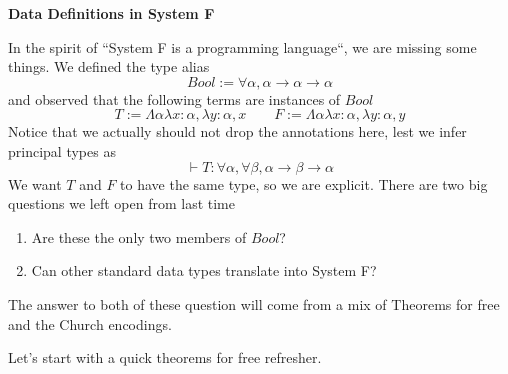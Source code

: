 \documentclass[12pt]{article}
\begin{document}
\baselineskip 12pt

\begin{center}
\textbf{\Large Data Definitions in System F} \\
\end{center}

In the spirit of ``System F is a programming language``, we are missing some things. 
We defined the type alias
\[
  Bool := \forall \alpha, \alpha \rightarrow \alpha \rightarrow \alpha
\]
and observed that the following terms are instances of $Bool$
\[
 T := \Lambda \alpha\lambda x:\alpha, \lambda y : \alpha, x \quad\quad F := \Lambda \alpha\lambda x:\alpha,\lambda y:\alpha, y
\]
Notice that we actually should not drop the annotations here, lest we infer principal types as 
\[
  \vdash T : \forall \alpha, \forall\beta, \alpha \rightarrow \beta \rightarrow \alpha
\]
We want $T$ and $F$ to have the same type, so we are explicit.
There are two big questions we left open from last time
\begin{enumerate}
    \item Are these the only two members of $Bool$?
    \item Can other standard data types translate into System F?
\end{enumerate}
The answer to both of these question will come from a mix of Theorems for free and the Church encodings.

Let's start with a quick theorems for free refresher.
\end{document}
